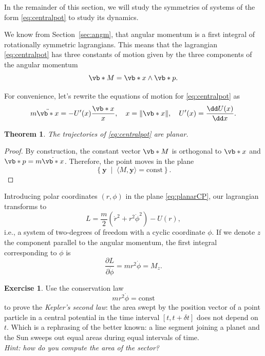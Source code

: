 \documentclass[english,fontsize=11pt,paper=b5]{scrbook}
\numberwithin{equation}{chapter}
\newtheorem{theorem}{Theorem}[chapter]
\theoremstyle{definition}
\newtheorem{exercise}{Exercise}[chapter]
\begin{document}
    In the remainder of this section, we will study the symmetries of systems of the form \eqref{eq:centralpot} to study its dynamics.

    We know from Section~\ref{sec:angm}, that angular momentum is a first integral of rotationally symmetric lagrangians.
    This means that the lagrangian \eqref{eq:centralpot} has three constants of motion given by the three components of the angular momentum
    \begin{equation}
      \vb*{M} = \vb*{x}\wedge \vb*{p}.
    \end{equation}

    For convenience, let's rewrite the equations of motion for \eqref{eq:centralpot} as
    \begin{equation}
      m\ddot{\vb*{x}} = - U'(x)\frac{\vb*{x}}{x}, \quad x = \|\vb*{x}\|, \quad U'(x)=\frac{\dd U(x)}{\dd x}.
    \end{equation}

    \begin{theorem}
      The trajectories of \eqref{eq:centralpot} are planar.
    \end{theorem}
    \begin{proof}
      By construction, the constant vector $\vb*{M}$ is orthogonal to $\vb*{x}$ and $\vb*{p} = m \dot{\vb*{x}}$.
      Therefore, the point moves in the plane
      \begin{equation}\label{eq:planarCP}
        \left\{\mathbf{y} \;\mid\; \langle M, \mathbf{y}\rangle = \mathrm{const} \right\}.
      \end{equation}
    \end{proof}

    Introducing polar coordinates $(r,\phi)$ in the plane \eqref{eq:planarCP}, our lagrangian transforms to
    \begin{equation}
      L = \frac{m}{2} \left(\dot r^2 + r^2 \dot \phi^2\right) - U(r),
    \end{equation}
    i.e., a system of two-degrees of freedom with a cyclic coordinate $\phi$.
    If we denote $z$ the component parallel to the angular momentum, the first integral corresponding to $\phi$ is
    \begin{equation}\label{eq:cyclicphi}
      \frac{\partial L}{\partial \dot \phi} = m r^2 \dot \phi = M_z.
    \end{equation}

    \begin{exercise}
      Use the conservation law
      \begin{equation}
        m r^2 \dot \phi = \mathrm{const}
      \end{equation}
      to prove the \emph{Kepler's second law}: the area swept by the position vector of a point particle in a central potential in the time interval $[t, t+\delta t]$ does not depend on $t$. Which is a rephrasing of the better known: a line segment joining a planet and the Sun sweeps out equal areas during equal intervals of time.\\
      \textit{Hint: how do you compute the area of the sector?}
    \end{exercise}
\end{document}
